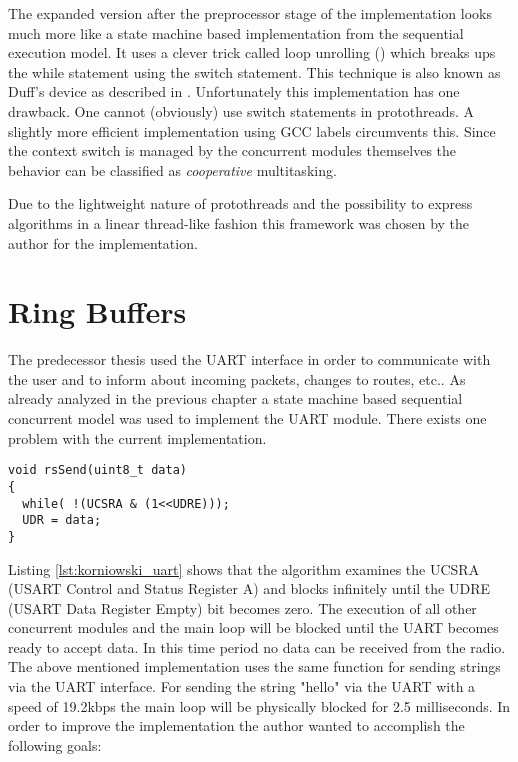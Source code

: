 The expanded version after the preprocessor stage of the implementation looks much more like a state machine based implementation from the sequential execution model. It uses a clever trick called loop unrolling (\cite{abrash}) which breaks ups the while statement using the switch statement. This technique is also known as Duff's device as described in \cite{duff}. Unfortunately this implementation has one drawback. One cannot (obviously) use switch statements in protothreads. A slightly more efficient implementation using GCC labels circumvents this. Since the context switch is managed by the concurrent modules themselves the behavior can be classified as \emph{cooperative} multitasking.

Due to the lightweight nature of protothreads and the possibility to express algorithms in a linear thread-like fashion this framework was chosen by the author for the implementation.

\section{Ring Buffers}
The predecessor thesis \cite{korniowski} used the UART interface in order to communicate with the user and to inform about incoming packets, changes to routes, etc.. As already analyzed in the previous chapter a state machine based sequential concurrent model was used to implement the UART module. There exists one problem with the current implementation.

\begin{lstlisting}[float,label=lst:korniowski_uart,caption=UART module sending function from thesis \cite{korniowski}]
void rsSend(uint8_t data)
{
  while( !(UCSRA & (1<<UDRE)));
  UDR = data;
}
\end{lstlisting}

Listing \ref{lst:korniowski_uart} shows that the algorithm examines the UCSRA (USART Control and Status Register A) and blocks infinitely until the UDRE (USART Data Register Empty) bit becomes zero. The execution of all other concurrent modules and the main loop will be blocked until the UART becomes ready to accept data. In this time period no data can be received from the radio. The above mentioned implementation uses the same function for sending strings via the UART interface. For sending the string "hello" via the UART with a speed of 19.2kbps the main loop will be physically blocked for 2.5 milliseconds. In order to improve the implementation the author wanted to accomplish the following goals:

